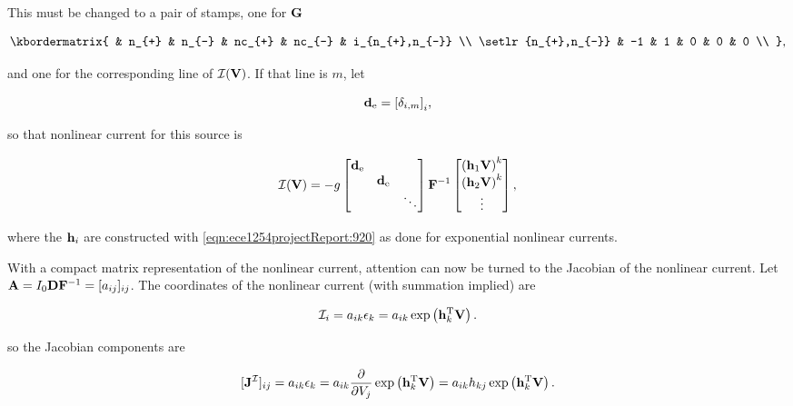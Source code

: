 This must be changed to a pair of stamps, one for \( \mathbf{G} \)

\begin{equation}\label{eqn:ece1254projectReport:1123}
\kbordermatrix{
        & n_{+} & n_{-} & nc_{+} & nc_{-} &  i_{n_{+},n_{-}} \\
\setlr{n_{+},n_{-}}        &    -1 & 1 & 0 & 0   & 0 \\
},
\end{equation}

and one for the corresponding line of \( {\mathcal{I}}(\mathbf{V}) \).  If that line is \( m \), let 

\begin{equation}\label{eqn:ece1254projectReport:1122}
\Bd_{\textrm{e}} = 
{[\delta_{i,m}]}_i,
\end{equation}

so that nonlinear current for this source is

\begin{equation}\label{eqn:ece1254projectReport:1124}
\calI(\BV) = -g 
\begin{bmatrix}
\Bd_{\textrm{e}} &  &  \\
   & \Bd_{\textrm{e}} & \\
   &  & \ddots 
\end{bmatrix}
\BF^{-1}
\begin{bmatrix}
 \lr{\Bh_1 \BV}^k \\
 \lr{\Bh_2 \BV}^k \\
 \vdots
\end{bmatrix},
\end{equation}

where the \( \mathbf{h}_i \) are constructed with \cref{eqn:ece1254projectReport:920} as done for exponential nonlinear currents.


With a compact matrix representation of the nonlinear current, attention can now be turned to the Jacobian of the nonlinear current.
Let \( \mathbf{A} = I_0 \mathbf{D} \mathbf{F}^{-1} = [ a_{ij} ]_{ij} \).
The coordinates of the nonlinear current (with summation implied) are

\begin{dmath}\label{eqn:ece1254projectReport:1120}
\calI_i = a_{ik} \epsilon_k = a_{ik} \exp\lr{ \Bh_k^\T \BV }.
\end{dmath}

so the Jacobian components are

\begin{dmath}\label{eqn:ece1254projectReport:1140}
[\BJ^{\calI}]_{ij}
=
a_{ik} \epsilon_k = a_{ik}
\PD{V_j}{}
\exp\lr{ \Bh_k^\T \BV }
=
a_{ik}
h_{kj}
\exp\lr{ \Bh_k^\T \BV }.
\end{dmath}

